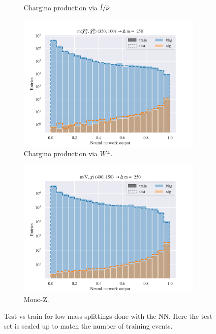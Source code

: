 \begin{figure}[H]
\begin{subfigure}[t!]{0.49\textwidth}
        \caption{Chargino production via $\Tilde{l}/\Tilde{\nu}$.}
        \label{fig:SlepsnuNNLow}
    \end{subfigure}    
    \begin{subfigure}[t!]{0.49\textwidth}
        \includegraphics[width = \textwidth]{Figures/WW/NN/All_level/Inter/scaled_train_test_395320.pdf}
        \caption{Chargino production via $W^\pm$.}
        \label{fig:WWNNLow}
    \end{subfigure}
    \begin{subfigure}[t!]{0.49\textwidth}
        \includegraphics[width = \textwidth]{Figures/Mono_Z/ML/NN/All_level/Inter/scaled_train_test_310613.pdf}
        \caption{Mono-Z.}
        \label{fig:MonoZNNLow}
    \end{subfigure}
    \caption{Test vs train for low mass splittings done with the NN. Here the test set is scaled up to match the number of training events.}
    \label{fig:AllLowNN}
\end{figure}




















